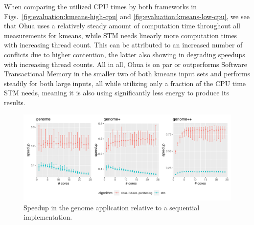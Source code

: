 When comparing the utilized CPU times by both frameworks in Figs.~\ref{fig:evaluation:kmeans-high-cpu} and \ref{fig:evaluation:kmeans-low-cpu}, we see that Ohua uses a relatively steady amount of computation time throughout all measurements for kmeans, while STM needs linearly more computation times with increasing thread count.
This can be attributed to an increased number of conflicts due to higher contention, the latter also showing in degrading speedups with increasing thread counts.
All in all, Ohua is on par or outperforms Software Transactional Memory in the smaller two of both kmeans input sets and performs steadily for both large inputs, all while utilizing only a fraction of the CPU time STM needs, meaning it is also using significantly less energy to produce its results.

\begin{figure}
    \centering
    \includegraphics[width=\textwidth,keepaspectratio]{gfx/results/genome_comb}
    \caption{Speedup in the genome application relative to a sequential implementation.}%
    \label{fig:evaluation:genome}
\end{figure}

